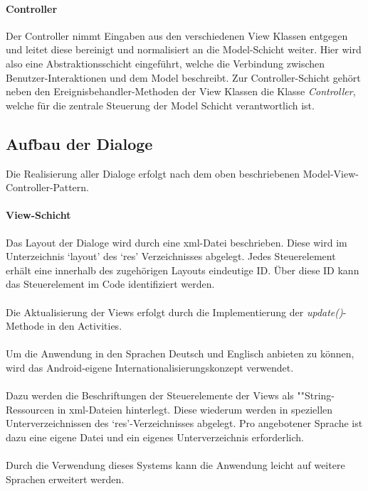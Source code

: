 \documentclass[10pt,a4paper]{article}
\begin{document}
  			\paragraph*{Controller}
  				Der Controller nimmt Eingaben aus den verschiedenen View Klassen entgegen und leitet diese bereinigt und normalisiert an die
  				Model-Schicht weiter. Hier wird also eine Abstraktionsschicht eingeführt, welche die Verbindung zwischen Benutzer-Interaktionen
  				und dem Model beschreibt. Zur Controller-Schicht gehört neben den Ereignisbehandler-Methoden der View Klassen die Klasse
  				\textit{Controller}, welche für die zentrale Steuerung der Model Schicht verantwortlich ist.
  				
		\subsection{Aufbau der Dialoge}
  		\label{sec:aufbau_dialoge}
	Die Realisierung aller Dialoge erfolgt nach dem oben beschriebenen Model-View-Controller-Pattern.
	
		\paragraph*{View-Schicht} Das Layout der Dialoge wird durch eine xml-Datei beschrieben. Diese wird im Unterzeichnis `layout' des `res'
		Verzeichnisses abgelegt. Jedes Steuerelement erhält eine innerhalb des zugehörigen Layouts eindeutige ID. Über diese ID kann das Steuerelement
		im Code identifiziert werden. \\ \\
		Die Aktualisierung der Views erfolgt durch die Implementierung der \textit{update()}-Methode in den Activities. \\ \\
		Um die Anwendung in den Sprachen Deutsch und Englisch anbieten zu können, wird das Android-eigene Internationalisierungskonzept verwendet. \\ \\
		Dazu werden die Beschriftungen der Steuerelemente der Views als ""String-Res\-sour\-cen in xml-Dateien hinterlegt. Diese wiederum werden in
		speziellen Unterverzeichnissen des `res'-Verzeichnisses abgelegt. Pro angebotener Sprache ist dazu eine eigene Datei und ein eigenes
		Unterverzeichnis erforderlich. \\ \\
		Durch die Verwendung dieses Systems kann die Anwendung leicht auf weitere Sprachen erweitert werden.
	
\end{document}
